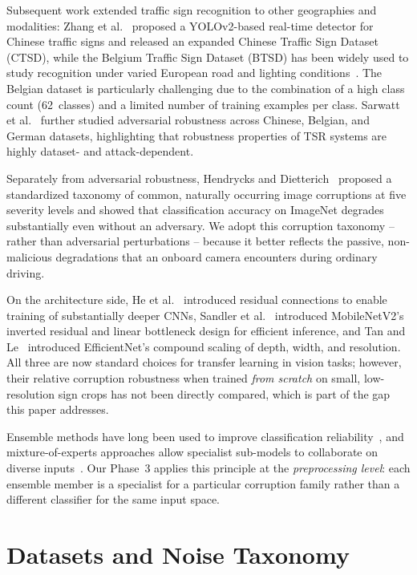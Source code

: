 \documentclass[conference]{IEEEtran}
\begin{document}
Subsequent work extended traffic sign recognition to other geographies and modalities: Zhang et al.~\cite{ctsd} proposed a YOLOv2-based real-time detector for Chinese traffic signs and released an expanded Chinese Traffic Sign Dataset (CTSD), while the Belgium Traffic Sign Dataset (BTSD) has been widely used to study recognition under varied European road and lighting conditions~\cite{btsd_timofte}. The Belgian dataset is particularly challenging due to the combination of a high class count (62~classes) and a limited number of training examples per class. Sarwatt et al.~\cite{btsd} further studied adversarial robustness across Chinese, Belgian, and German datasets, highlighting that robustness properties of TSR systems are highly dataset- and attack-dependent.

Separately from adversarial robustness, Hendrycks and Dietterich~\cite{hendrycks2019robustness} proposed a standardized taxonomy of common, naturally occurring image corruptions at five severity levels and showed that classification accuracy on ImageNet degrades substantially even without an adversary. We adopt this corruption taxonomy -- rather than adversarial perturbations -- because it better reflects the passive, non-malicious degradations that an onboard camera encounters during ordinary driving.

On the architecture side, He et al.~\cite{resnet} introduced residual connections to enable training of substantially deeper CNNs, Sandler et al.~\cite{mobilenetv2} introduced MobileNetV2's inverted residual and linear bottleneck design for efficient inference, and Tan and Le~\cite{efficientnet} introduced EfficientNet's compound scaling of depth, width, and resolution. All three are now standard choices for transfer learning in vision tasks; however, their relative corruption robustness when trained \emph{from scratch} on small, low-resolution sign crops has not been directly compared, which is part of the gap this paper addresses.

Ensemble methods have long been used to improve classification reliability~\cite{ensemble_dietterich}, and mixture-of-experts approaches allow specialist sub-models to collaborate on diverse inputs~\cite{jacobs1991adaptive}. Our Phase~3 applies this principle at the \emph{preprocessing level}: each ensemble member is a specialist for a particular corruption family rather than a different classifier for the same input space.

\section{Datasets and Noise Taxonomy}
\end{document}

